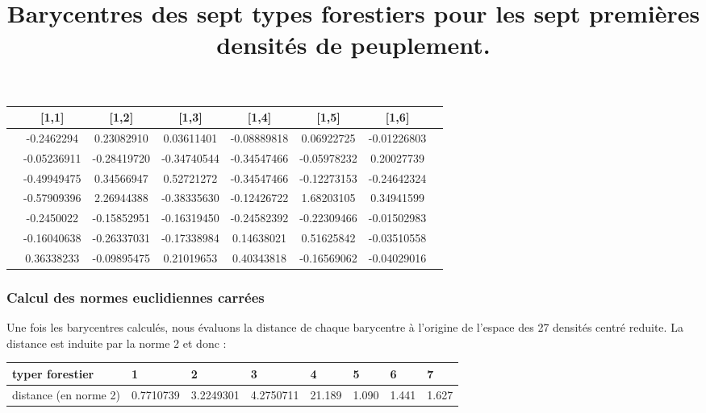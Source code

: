 \documentclass{article}
\begin{document}
\begin{table}[h]
    \centering
    \begin{tabular}{|c|c|c|c|c|c|c|c|}
    \hline
         & [1,1]      & [1,2]      & [1,3]      & [1,4]      & [1,5]      & [1,6]           \\ \hline
    [1,] & -0.2462294 & 0.23082910 & 0.03611401 & -0.08889818 & 0.06922725 & -0.01226803  \\ \hline
    [2,] & -0.05236911 & -0.28419720 & -0.34740544 & -0.34547466 & -0.05978232 & 0.20027739  \\ \hline
    [3,] & -0.49949475 & 0.34566947 & 0.52721272 & -0.34547466 & -0.12273153 & -0.24642324  \\ \hline
    [4,] & -0.57909396 & 2.26944388 & -0.38335630 & -0.12426722 & 1.68203105 & 0.34941599   \\ \hline
    [5,] & -0.2450022 & -0.15852951 & -0.16319450 & -0.24582392 & -0.22309466 & -0.01502983  \\ \hline
    [6,] & -0.16040638 & -0.26337031 & -0.17338984 & 0.14638021 & 0.51625842 & -0.03510558  \\ \hline
    [7,] & 0.36338233 & -0.09895475 & 0.21019653 & 0.40343818 & -0.16569062 & -0.04029016  \\ \hline
    \end{tabular}
    \title{Barycentres des sept types forestiers pour les sept premières densités de peuplement.}
    \label{tab:barycentres}
    \end{table}

\subsubsection{Calcul des normes euclidiennes carrées}
Une fois les barycentres calculés, nous évaluons la distance de chaque barycentre à l'origine de l'espace des 27 densités centré reduite. La distance est induite par la norme 2 et donc :

\begin{table}[H]
    \begin{tabular}{|l|l|l|l|l|l|l|l|}
    \hline
    typer forestier       & 1         & 2         & 3         & 4      & 5     & 6     & 7     \\ \hline
    distance (en norme 2) & 0.7710739 & 3.2249301 & 4.2750711 & 21.189 & 1.090 & 1.441 & 1.627 \\ \hline
    \end{tabular}
    \end{table}
\end{document}
